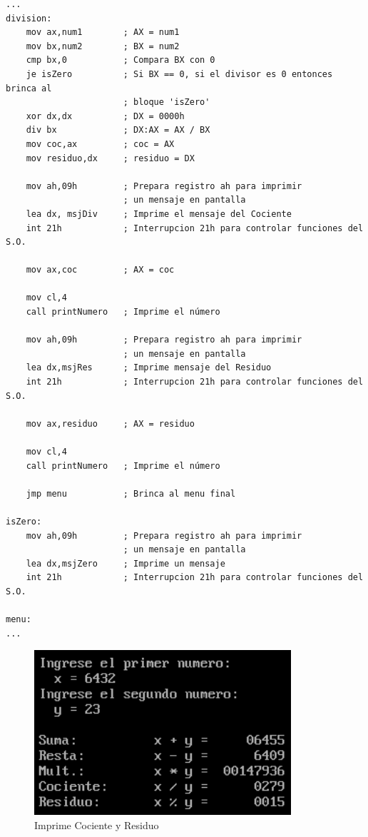 \documentclass[letter,12 pt,titlepage]{article}
\begin{document}
    \begin{verbatim}
...
division:
    mov ax,num1        ; AX = num1
    mov bx,num2        ; BX = num2
    cmp bx,0           ; Compara BX con 0
    je isZero          ; Si BX == 0, si el divisor es 0 entonces brinca al 
                       ; bloque 'isZero'
    xor dx,dx          ; DX = 0000h
    div bx             ; DX:AX = AX / BX
    mov coc,ax         ; coc = AX
    mov residuo,dx     ; residuo = DX

    mov ah,09h         ; Prepara registro ah para imprimir 
                       ; un mensaje en pantalla
    lea dx, msjDiv     ; Imprime el mensaje del Cociente
    int 21h            ; Interrupcion 21h para controlar funciones del S.O.

    mov ax,coc         ; AX = coc

    mov cl,4
    call printNumero   ; Imprime el número 

    mov ah,09h         ; Prepara registro ah para imprimir 
                       ; un mensaje en pantalla
    lea dx,msjRes      ; Imprime mensaje del Residuo
    int 21h            ; Interrupcion 21h para controlar funciones del S.O.

    mov ax,residuo     ; AX = residuo
        
    mov cl,4
    call printNumero   ; Imprime el número 

    jmp menu           ; Brinca al menu final

isZero:
    mov ah,09h         ; Prepara registro ah para imprimir 
                       ; un mensaje en pantalla
    lea dx,msjZero     ; Imprime un mensaje
    int 21h            ; Interrupcion 21h para controlar funciones del S.O.

menu:
...
    \end{verbatim}

    \begin{figure}[H]
    \centering
    \includegraphics[width=0.85\textwidth]{img/06.png}
    \caption{Imprime Cociente y Residuo}
    \end{figure}
\end{document}
